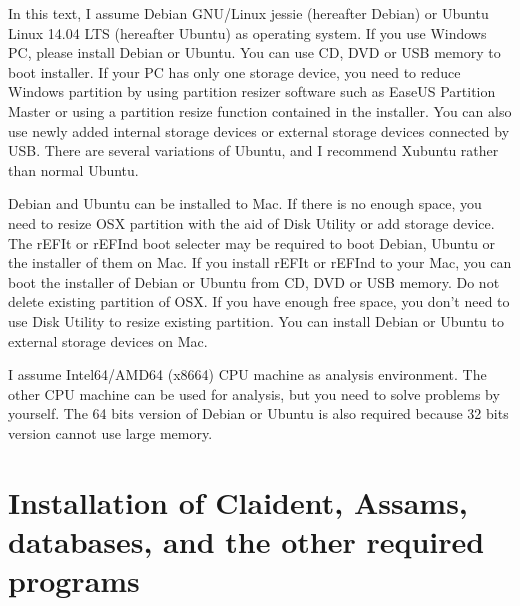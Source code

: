 \documentclass[titlepage,10pt,a4paper,english]{jsbook}
\begin{document}
In this text, I assume Debian GNU/Linux jessie (hereafter Debian) or Ubuntu Linux 14.04 LTS (hereafter Ubuntu) as operating system. If you use Windows PC, please install Debian or Ubuntu. You can use CD, DVD or USB memory to boot installer. If your PC has only one storage device, you need to reduce Windows partition by using partition resizer software such as EaseUS Partition Master or using a partition resize function contained in the installer. You can also use newly added internal storage devices or external storage devices connected by USB. There are several variations of Ubuntu, and I recommend Xubuntu rather than normal Ubuntu.

Debian and Ubuntu can be installed to Mac. If there is no enough space, you need to resize OSX partition with the aid of Disk Utility or add storage device. The rEFIt or rEFInd boot selecter may be required to boot Debian, Ubuntu or the installer of them on Mac. If you install rEFIt or rEFInd to your Mac, you can boot the installer of Debian or Ubuntu from CD, DVD or USB memory. Do not delete existing partition of OSX. If you have enough free space, you don't need to use Disk Utility to resize existing partition. You can install Debian or Ubuntu to external storage devices on Mac.

I assume Intel64/AMD64 (x86{\textunderscore}64) CPU machine as analysis environment. The other CPU machine can be used for analysis, but you need to solve problems by yourself. The 64 bits version of Debian or Ubuntu is also required because 32 bits version cannot use large memory.

\section{Installation of Claident, Assams, databases, and the other required programs}
\end{document}

